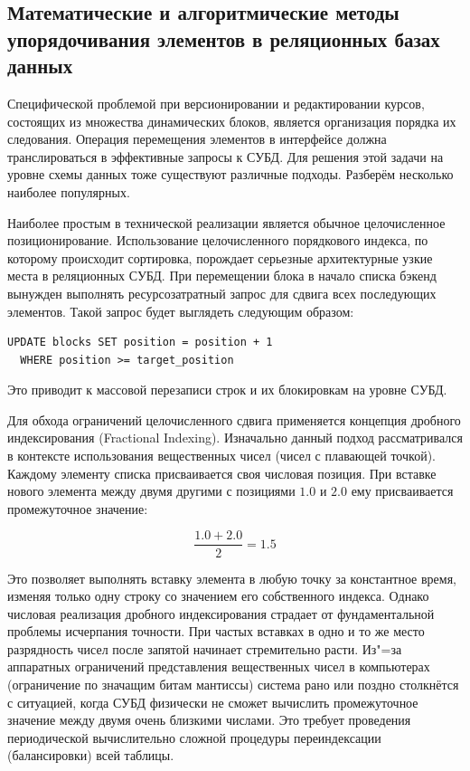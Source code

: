 \documentclass[coursework]{SCWorks}
\begin{document}
\subsection{Математические и алгоритмические методы упорядочивания элементов в реляционных базах данных}

Специфической проблемой при версионировании и редактировании курсов, состоящих из множества динамических блоков, является организация порядка их следования. Операция перемещения элементов в интерфейсе должна транслироваться в эффективные запросы к СУБД. Для решения этой задачи на уровне схемы данных тоже существуют различные подходы. Разберём несколько наиболее популярных.

Наиболее простым в технической реализации является обычное целочисленное позиционирование. Использование целочисленного порядкового индекса, по которому происходит сортировка, порождает серьезные архитектурные узкие места в реляционных СУБД. При перемещении блока в начало списка бэкенд вынужден выполнять ресурсозатратный запрос для сдвига всех последующих элементов. Такой запрос будет выглядеть следующим образом:

\begin{verbatim}
UPDATE blocks SET position = position + 1
  WHERE position >= target_position
\end{verbatim}

Это приводит к массовой перезаписи строк и их блокировкам на уровне СУБД.

Для обхода ограничений целочисленного сдвига применяется концепция дробного индексирования (Fractional Indexing). Изначально данный подход рассматривался в контексте использования вещественных чисел (чисел с плавающей точкой). Каждому элементу списка присваивается своя числовая позиция. При вставке нового элемента между двумя другими с позициями $1.0$ и $2.0$ ему присваивается промежуточное значение:

\[ \frac{1.0 + 2.0}{2} = 1.5 \]

Это позволяет выполнять вставку элемента в любую точку за константное время, изменяя только одну строку со значением его собственного индекса. Однако числовая реализация дробного индексирования страдает от фундаментальной проблемы исчерпания точности. При частых вставках в одно и то же место разрядность чисел после запятой начинает стремительно расти. Из"=за аппаратных ограничений представления вещественных чисел в компьютерах (ограничение по значащим битам мантиссы) система рано или поздно столкнётся с ситуацией, когда СУБД физически не сможет вычислить промежуточное значение между двумя очень близкими числами. Это требует проведения периодической вычислительно сложной процедуры переиндексации (балансировки) всей таблицы.
\end{document}
